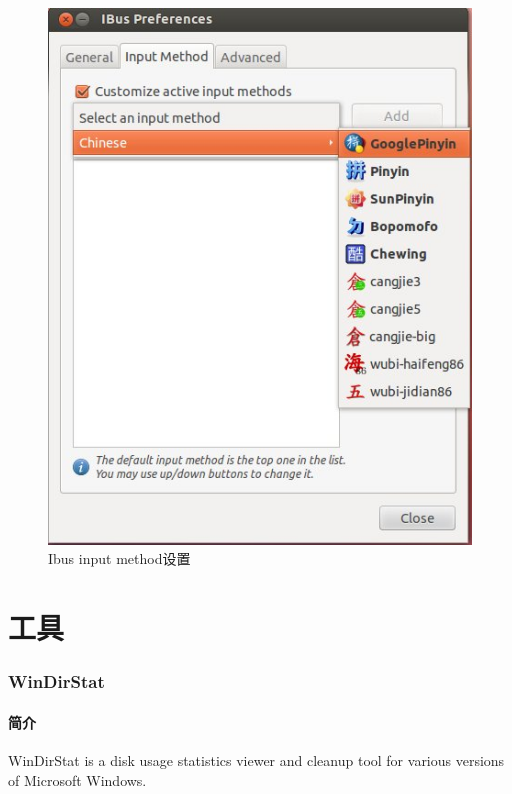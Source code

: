 \documentclass[paper=a4,fontsize=11pt]{article}
\begin{document}
\begin{enumerate}
		\begin{figure}[htbp]
			\centering
			\includegraphics[scale=0.7]{IbusSetupGooglePinyin.jpeg}
			\caption{Ibus input method设置}
			\label{IbusSetupGooglePinyin}
		\end{figure}
		
		
	\end{enumerate}
	
	\clearpage
		
	\part{工具}
	
	\clearpage
	
	\section{WinDirStat}
	
	\subsection{简介}
	WinDirStat is a disk usage statistics viewer and cleanup tool for various versions of Microsoft Windows.
	
\end{document}
